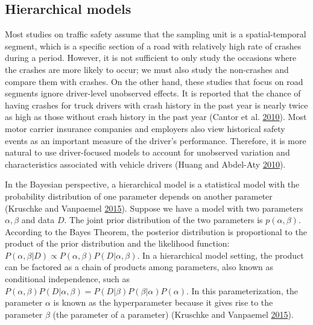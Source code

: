 \documentclass[12pt]{book}
\numberwithin{equation}{chapter}
\begin{document}
\hypertarget{hierarchical-models}{%
\subsection{Hierarchical models}\label{hierarchical-models}}

Most studies on traffic safety assume that the sampling unit is a spatial-temporal segment, which is a specific section of a road with relatively high rate of crashes during a period. However, it is not sufficient to only study the occasions where the crashes are more likely to occur; we must also study the non-crashes and compare them with crashes. On the other hand, these studies that focus on road segments ignore driver-level unobserved effects. It is reported that the chance of having crashes for truck drivers with crash history in the past year is nearly twice as high as those without crash history in the past year (Cantor et al. \protect\hyperlink{ref-cantor2010driver}{2010}). Most motor carrier insurance companies and employers also view historical safety events as an important measure of the driver's performance. Therefore, it is more natural to use driver-focused models to account for unobserved variation and characteristics associated with vehicle drivers (Huang and Abdel-Aty \protect\hyperlink{ref-huang2010multilevel}{2010}).

In the Bayesian perspective, a hierarchical model is a statistical model with the probability distribution of one parameter depends on another parameter (Kruschke and Vanpaemel \protect\hyperlink{ref-kruschke2015bayesian}{2015}). Suppose we have a model with two parameters \(\alpha, \beta\) and data \(D\). The joint prior distribution of the two parameters is \(p(\alpha, \beta)\). According to the Bayes Theorem, the posterior distribution is proportional to the product of the prior distribution and the likelihood function: \(P(\alpha, \beta|D) \propto P(\alpha, \beta)P(D|\alpha,\beta)\). In a hierarchical model setting, the product can be factored as a chain of products among parameters, also known as conditional independence, such as \(P(\alpha, \beta)P(D|\alpha,\beta) = P(D|\beta)P(\beta|\alpha)P(\alpha)\). In this parameterization, the parameter \(\alpha\) is known as the hyperparameter because it gives rise to the parameter \(\beta\) (the parameter of a parameter) (Kruschke and Vanpaemel \protect\hyperlink{ref-kruschke2015bayesian}{2015}).
\end{document}
